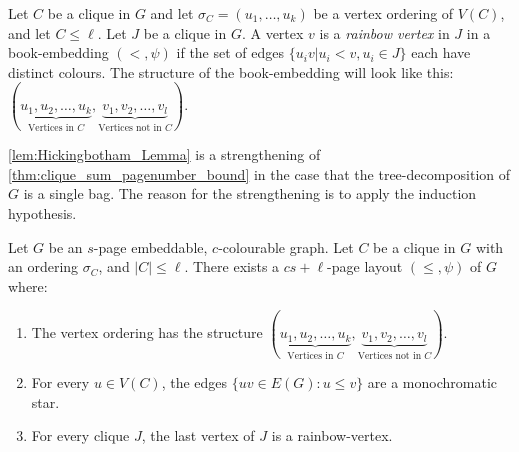 Let \(C\) be a clique in \(G\) and let \(\sigma_C = (u_1, \ldots , u_k)\) be a vertex ordering of \(V(C)\), and let \(C \leq \ell \). Let $J$ be a clique in $G$. A vertex $v$ is a \textit{rainbow vertex} in $J$ in a book-embedding $(<, \psi)$ if the set of edges $\{u_i v | u_i < v, u_i \in J\}$ each have distinct colours. The structure of the book-embedding will look like this: \((\underbrace{u_1, u_2, \ldots, u_k}_{\text{Vertices in } C}, \underbrace{v_1, v_2, \ldots, v_l}_{\text{Vertices not in }C})\).

\cref{lem:Hickingbotham_Lemma} is a strengthening of \cref{thm:clique_sum_pagenumber_bound} in the case that the tree-decomposition of $G$ is a single bag. The reason for the strengthening is to apply the induction hypothesis.
\begin{lemma}\label{lem:Hickingbotham_Lemma}
	Let \(G\) be an $s$-page embeddable, $c$-colourable graph. Let $C$ be a clique in $G$ with an ordering \(\sigma_C\), and $|C| \leq \ell$. There exists a \(cs + \ell\)-page layout \((\leq, \psi)\) of \(G\) where:
	\begin{enumerate}
		\item The vertex ordering has the structure \((\underbrace{u_1, u_2, \ldots, u_k}_{\text{Vertices in } C}, \underbrace{v_1, v_2, \ldots, v_l}_{\text{Vertices not in }C})\).
		\item For every \(u \in V(C)\), the edges \(\lbrace uv \in E(G) : u \leq v \rbrace\) are a monochromatic star.
		\item For every clique \(J\), the last vertex of \(J\) is a rainbow-vertex.
	\end{enumerate}
\end{lemma}

